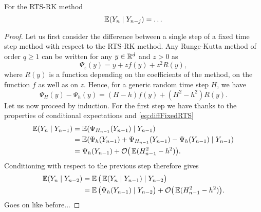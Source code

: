 \documentclass[10pt]{article}
\begin{document}
\begin{lemma} For the RTS-RK method
	\begin{equation}
	\operatorname{\mathbb{E}}(Y_n \mid Y_{n-j}) = \ldots 
	\end{equation}
\end{lemma}

\begin{proof} Let us first consider the difference between a single step of a fixed time step method with respect to the RTS-RK method. Any Runge-Kutta method of order $q \geq 1$ can be written for any $y \in \mathbb{R}^d$ and $z > 0$ as
	\begin{equation}
		\Psi_z(y) = y + z f(y) + z^2 R(y),
	\end{equation}
	where $R(y)$ is a function depending on the coefficients of the method, on the function $f$ as well as on $z$. Hence, for a generic random time step $H$, we have
	\begin{equation}\label{eq:diffFixedRTS}
		\Psi_H(y) - \Psi_h(y) = (H - h) f(y) + (H^2 - h^2) R(y).
	\end{equation} 
	Let us now proceed by induction. For the first step we have thanks to the properties of conditional expectations and \eqref{eq:diffFixedRTS}
	\begin{equation}
	\begin{aligned}
		\operatorname{\mathbb{E}}(Y_n \mid Y_{n-1}) &= \operatorname{\mathbb{E}}(\Psi_{H_{n-1}}(Y_{n-1}) \mid Y_{n-1}) \\
		&= \operatorname{\mathbb{E}}(\Psi_h(Y_{n-1}) + \Psi_{H_{n-1}}(Y_{n-1}) - \Psi_h(Y_{n-1})\mid Y_{n-1}) \\
		&= \Psi_h(Y_{n-1}) + \mathcal{O}\big(\operatorname{\mathbb{E}}(H_{n-1}^2 - h^2)\big).
 	\end{aligned}
 	\end{equation}
 	Conditioning with respect to the previous step therefore gives
 	\begin{equation}
 	\begin{aligned}
		\operatorname{\mathbb{E}}(Y_n \mid Y_{n-2}) &= \operatorname{\mathbb{E}}\big(\operatorname{\mathbb{E}}(Y_n \mid Y_{n-1}) \mid Y_{n-2}\big) \\
		&= \operatorname{\mathbb{E}}\big(\Psi_h(Y_{n-1})\mid Y_{n-2}\big) + \mathcal{O}\big(\operatorname{\mathbb{E}}(H_{n-1}^2 - h^2)\big).
 	\end{aligned}
 	\end{equation}
 	Goes on like before...
\end{proof}
\end{document}
